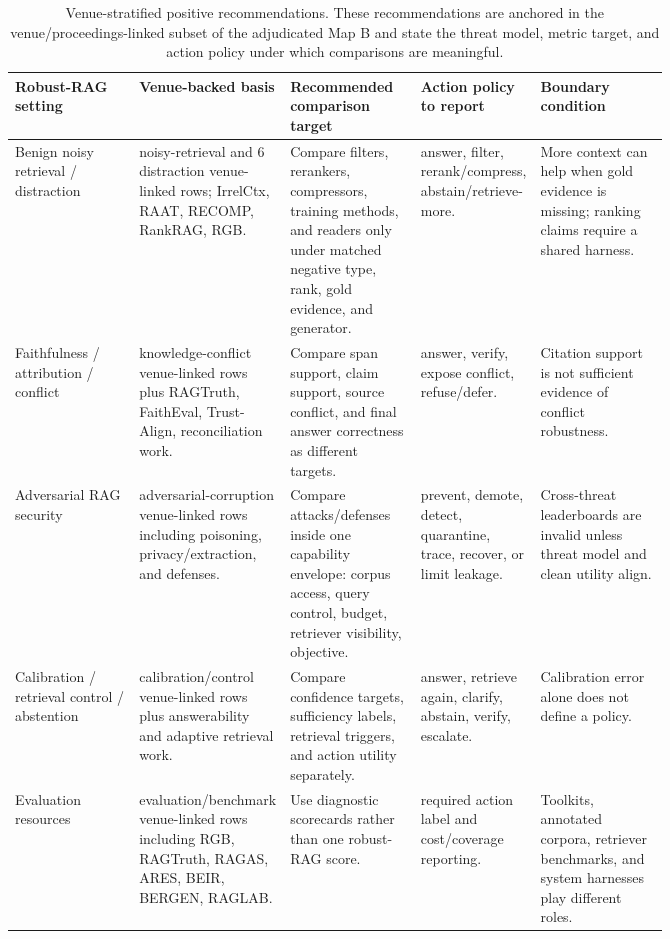 \documentclass[11pt]{article}
\begin{document}
\begin{table}[t]
\centering
\scriptsize
\renewcommand{\arraystretch}{0.9}
\begin{tabularx}{\linewidth}{>{\raggedright\arraybackslash}p{0.19\linewidth}>{\raggedright\arraybackslash}p{0.19\linewidth}>{\raggedright\arraybackslash}p{0.20\linewidth}>{\raggedright\arraybackslash}p{0.18\linewidth}X}
\toprule
\textbf{Robust-RAG setting} & \textbf{Venue-backed basis} & \textbf{Recommended comparison target} & \textbf{Action policy to report} & \textbf{Boundary condition} \\
\midrule
Benign noisy retrieval / distraction & 22 noisy-retrieval and 6 distraction venue-linked rows; IrrelCtx, RAAT, RECOMP, RankRAG, RGB. & Compare filters, rerankers, compressors, training methods, and readers only under matched negative type, rank, gold evidence, and generator. & answer, filter, rerank/compress, abstain/retrieve-more. & More context can help when gold evidence is missing; ranking claims require a shared harness. \\
Faithfulness / attribution / conflict & 16 knowledge-conflict venue-linked rows plus RAGTruth, FaithEval, Trust-Align, reconciliation work. & Compare span support, claim support, source conflict, and final answer correctness as different targets. & answer, verify, expose conflict, refuse/defer. & Citation support is not sufficient evidence of conflict robustness. \\
Adversarial RAG security & 26 adversarial-corruption venue-linked rows including poisoning, privacy/extraction, and defenses. & Compare attacks/defenses inside one capability envelope: corpus access, query control, budget, retriever visibility, objective. & prevent, demote, detect, quarantine, trace, recover, or limit leakage. & Cross-threat leaderboards are invalid unless threat model and clean utility align. \\
Calibration / retrieval control / abstention & 20 calibration/control venue-linked rows plus answerability and adaptive retrieval work. & Compare confidence targets, sufficiency labels, retrieval triggers, and action utility separately. & answer, retrieve again, clarify, abstain, verify, escalate. & Calibration error alone does not define a policy. \\
Evaluation resources & 28 evaluation/benchmark venue-linked rows including RGB, RAGTruth, RAGAS, ARES, BEIR, BERGEN, RAGLAB. & Use diagnostic scorecards rather than one robust-RAG score. & required action label and cost/coverage reporting. & Toolkits, annotated corpora, retriever benchmarks, and system harnesses play different roles. \\
\bottomrule
\end{tabularx}
\caption{Venue-stratified positive recommendations. These recommendations are anchored in the venue/proceedings-linked subset of the adjudicated Map B and state the threat model, metric target, and action policy under which comparisons are meaningful.}
\label{tab:venue-backed-recommendations}
\end{table}
\end{document}
